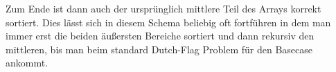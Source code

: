 \documentclass[a4paper,graphics,11pt]{article}
\begin{document}
Zum Ende ist dann auch der ursprünglich mittlere Teil des Arrays korrekt sortiert. Dies lässt sich in diesem
Schema beliebig oft fortführen in dem man immer erst die beiden äußersten Bereiche sortiert und dann rekursiv
den mittleren, bis man beim standard Dutch-Flag Problem für den Basecase ankommt.
\end{document}
